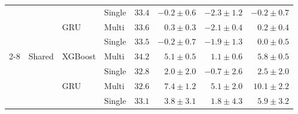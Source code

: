 \begin{table}[h]
\begin{tabular}{@{}llllrrrr@{}}
          &          &         & Single & $33.4$ & $-0.2 \pm 0.6$ & $-2.3 \pm 1.2$ & $-0.2 \pm 0.7$ \\
          &          & GRU     & Multi  & $33.6$ & $0.3 \pm 0.3$  & $-2.1 \pm 0.4$ & $0.2 \pm 0.4$ \\
          &          &         & Single & $33.5$ & $-0.2 \pm 0.7$ & $-1.9 \pm 1.3$ & $0.0 \pm 0.5$ \\
    \cmidrule{2-8}
          & Shared   & XGBoost & Multi  & $34.2$ & $5.1 \pm 0.5$ & $1.1 \pm 0.6$  & $5.8 \pm 0.5$ \\
          &          &         & Single & $32.8$ & $2.0 \pm 2.0$ & $-0.7 \pm 2.6$ & $2.5 \pm 2.0$ \\
          &          & GRU     & Multi  & $32.6$ & $7.4 \pm 1.2$ & $5.1 \pm 2.0$  & $10.1 \pm 2.2$ \\
          &          &         & Single & $33.1$ & $3.8 \pm 3.1$ & $1.8 \pm 4.3$  & $5.9 \pm 3.2$ \\
    \bottomrule
  \end{tabular}
\end{table}
